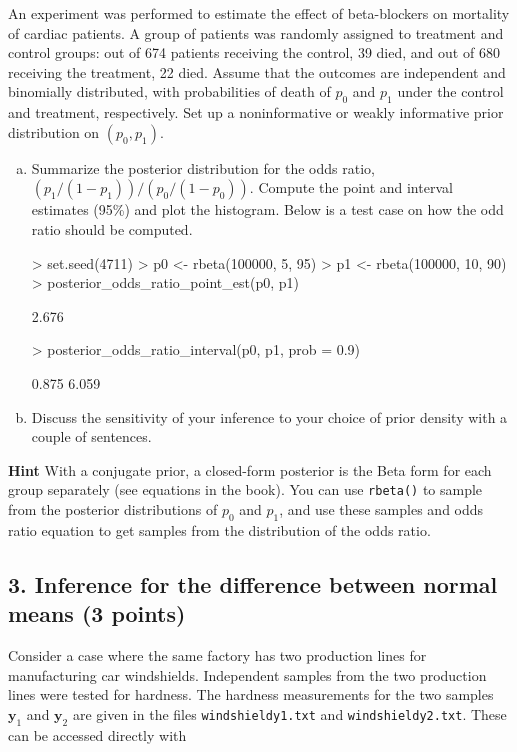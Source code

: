 \documentclass[a4paper,11pt]{article}
\begin{document}

An experiment was performed to estimate the effect of beta-blockers
on mortality of cardiac patients. A group of patients was randomly
assigned to treatment and control groups: out of 674 patients
receiving the control, 39 died, and out of 680 receiving the
treatment, 22 died. Assume that the outcomes are independent and
binomially distributed, with probabilities of death of $p_0$ and $p_1$
under the control and treatment, respectively. Set up a noninformative
or weakly informative prior distribution on $(p_0,p_1)$. 
\begin{enumerate}[a)]
\item Summarize the posterior distribution for the odds ratio, $(p_1/(1-p_1))/(p_0/(1-p_0))$. Compute the point and interval estimates (95\%) and plot the histogram. Below is a test case on how the odd ratio should be computed.
\begin{Schunk}
\begin{Sinput}
> set.seed(4711)
> p0 <- rbeta(100000, 5, 95)
> p1 <- rbeta(100000, 10, 90)
> posterior_odds_ratio_point_est(p0, p1)
\end{Sinput}
\begin{Soutput}
[1] 2.676
\end{Soutput}
\begin{Sinput}
> posterior_odds_ratio_interval(p0, p1, prob = 0.9)
\end{Sinput}
\begin{Soutput}
[1] 0.875 6.059
\end{Soutput}
\end{Schunk}
\item Discuss the sensitivity of your inference
to your choice of prior density with a couple of sentences.
\end{enumerate}
\textbf{Hint} With a conjugate prior, a closed-form posterior is the Beta form for each group separately (see equations in the book). You can use {\tt rbeta()} to sample from the posterior distributions of $p_0$ and $p_1$, and use these samples and odds ratio equation to get samples from the distribution of the odds ratio.

\subsection*{3. Inference for the difference between normal means (3 points)}

Consider a case where the same factory has two production lines for
manufacturing car windshields. Independent samples from the two
production lines were tested for hardness. The hardness measurements
for the two samples $\mathbf{y}_1$ and $\mathbf{y}_2$ are given in the files {\tt windshieldy1.txt} and {\tt windshieldy2.txt}. These can be accessed directly with
\end{document}
